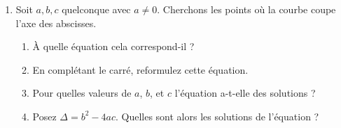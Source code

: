\documentclass{article}
\begin{document}
\begin{enumerate}
    \item Soit $a,b,c$ quelconque avec $a \neq 0$.
    Cherchons les points où la courbe coupe l'axe des abscisses.
        \begin{enumerate}
            \item À quelle équation cela correspond-il ?
            \item En complétant le carré, reformulez cette équation.
            \item Pour quelles valeurs de $a$, $b$, et $c$ l'équation a-t-elle des solutions ?
            \item Posez $\Delta = b^2 - 4ac$. Quelles sont alors les solutions de l'équation ?
        \end{enumerate}
\end{enumerate}

\newpage
\end{document}
